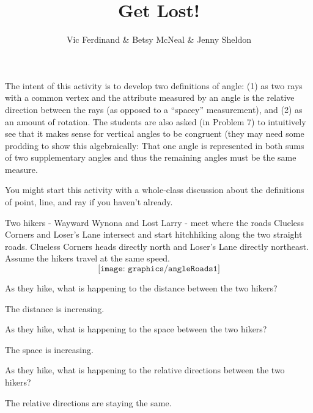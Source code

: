 \documentclass{ximera}
\title{Get Lost!}
\author{Vic Ferdinand \& Betsy McNeal \& Jenny Sheldon}
\begin{document}
\begin{abstract}
\end{abstract}
\maketitle

\begin{instructorIntro}
The intent of this activity is to develop two definitions of angle:
(1) as two rays with a common vertex and the attribute measured by an angle is the relative direction between the rays (as opposed to a ``spacey'' measurement), and (2) as an amount of rotation.  The students are also asked (in Problem 7) to intuitively see that it makes sense for vertical angles to be congruent (they may need some prodding to show this algebraically:  That one angle is represented in both sums of two supplementary angles and thus the remaining angles must be the same measure.

You might start this activity with a whole-class discussion about the definitions of point, line, and ray if you haven't already.
\end{instructorIntro}

Two hikers - Wayward Wynona and Lost Larry - meet where the roads Clueless Corners and Loser's Lane intersect and start hitchhiking along the two straight roads.  Clueless Corners heads directly north and Loser’s Lane directly northeast.  Assume the hikers travel at the same speed.
\[
\texttt{[image: graphics/angleRoads1]}
\]

\begin{problem}
As they hike, what is happening to the distance between the two hikers?
\begin{solution}
The distance is increasing.
\end{solution}
\end{problem}

\begin{problem}
As they hike, what is happening to the space between the two hikers?
\begin{solution}
The space is increasing.
\end{solution}
\end{problem}

\begin{problem}
As they hike, what is happening to the relative directions between the two hikers?
\begin{solution}
The relative directions are staying the same.
\end{solution}
\end{problem}
\end{document}
